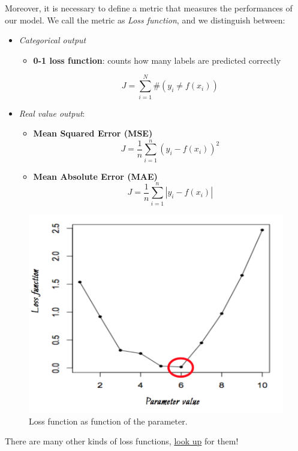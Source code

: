 Moreover, it is necessary to define a metric that measures the performances of our model. We call the metric as \emph{Loss function}, and we distinguish between:
\begin{itemize}
\item \emph{Categorical output}
\begin{itemize}
\item \textbf{0-1 loss function}: counts how many labels are predicted correctly

$$J = \sum_{i=1}^{N} \#(y_i \neq f(x_i))$$
\end{itemize}
\item \emph{Real value output}: 

\begin{itemize}
\item \textbf{Mean Squared Error (MSE)}
$$J = \frac{1}{n}\sum_{i=1}^{n} (y_i -  f(x_i))^2$$
\item \textbf{Mean Absolute Error (MAE)}
$$J = \frac{1}{n}\sum_{i=1}^{n} |y_i -  f(x_i)|$$
\end{itemize}

\end{itemize}

\begin{figure}[H]%
 \centering
 \includegraphics[width=13cm]{./img/08/loss_parameter}
 \caption{\label{pic:loss_parameter} Loss function as function of the parameter.}
\end{figure}

There are many other kinds of loss functions, \href{https://en.wikipedia.org/wiki/Loss_function}{look up} for them!

